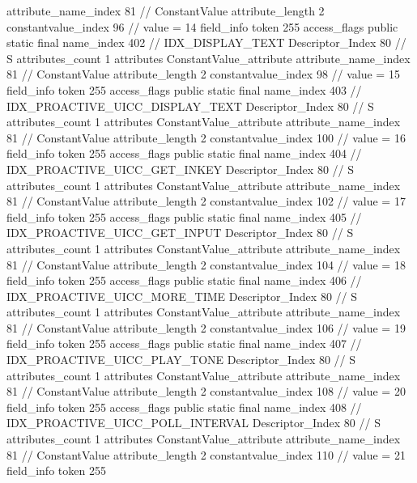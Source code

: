 {{{{{{{					attribute_name_index	81		// ConstantValue
					attribute_length	2
					constantvalue_index	96		// value = 14
				}
				}
			}
			field_info {
				token	255
				access_flags	public static final
				name_index	402		// IDX_DISPLAY_TEXT
				Descriptor_Index	80		// S
				attributes_count	1
				attributes {
				ConstantValue_attribute {
					attribute_name_index	81		// ConstantValue
					attribute_length	2
					constantvalue_index	98		// value = 15
				}
				}
			}
			field_info {
				token	255
				access_flags	public static final
				name_index	403		// IDX_PROACTIVE_UICC_DISPLAY_TEXT
				Descriptor_Index	80		// S
				attributes_count	1
				attributes {
				ConstantValue_attribute {
					attribute_name_index	81		// ConstantValue
					attribute_length	2
					constantvalue_index	100		// value = 16
				}
				}
			}
			field_info {
				token	255
				access_flags	public static final
				name_index	404		// IDX_PROACTIVE_UICC_GET_INKEY
				Descriptor_Index	80		// S
				attributes_count	1
				attributes {
				ConstantValue_attribute {
					attribute_name_index	81		// ConstantValue
					attribute_length	2
					constantvalue_index	102		// value = 17
				}
				}
			}
			field_info {
				token	255
				access_flags	public static final
				name_index	405		// IDX_PROACTIVE_UICC_GET_INPUT
				Descriptor_Index	80		// S
				attributes_count	1
				attributes {
				ConstantValue_attribute {
					attribute_name_index	81		// ConstantValue
					attribute_length	2
					constantvalue_index	104		// value = 18
				}
				}
			}
			field_info {
				token	255
				access_flags	public static final
				name_index	406		// IDX_PROACTIVE_UICC_MORE_TIME
				Descriptor_Index	80		// S
				attributes_count	1
				attributes {
				ConstantValue_attribute {
					attribute_name_index	81		// ConstantValue
					attribute_length	2
					constantvalue_index	106		// value = 19
				}
				}
			}
			field_info {
				token	255
				access_flags	public static final
				name_index	407		// IDX_PROACTIVE_UICC_PLAY_TONE
				Descriptor_Index	80		// S
				attributes_count	1
				attributes {
				ConstantValue_attribute {
					attribute_name_index	81		// ConstantValue
					attribute_length	2
					constantvalue_index	108		// value = 20
				}
				}
			}
			field_info {
				token	255
				access_flags	public static final
				name_index	408		// IDX_PROACTIVE_UICC_POLL_INTERVAL
				Descriptor_Index	80		// S
				attributes_count	1
				attributes {
				ConstantValue_attribute {
					attribute_name_index	81		// ConstantValue
					attribute_length	2
					constantvalue_index	110		// value = 21
				}
				}
			}
			field_info {
				token	255
}}}}}
